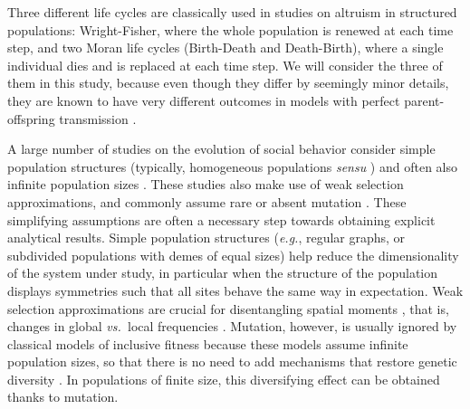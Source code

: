 \documentclass[11pt, letterpaper]{article}
\newcommand{\eg}{\textit{e.g.}}
\newcommand{\vs}{\textit{vs.\ }}
\begin{document}
Three different life cycles are classically used in studies on altruism in structured populations: Wright-Fisher, where the whole population is renewed at each time step, and two Moran life cycles (Birth-Death and Death-Birth), where a single individual dies and is replaced at each time step. We will consider the three of them in this study, because even though they differ by seemingly minor details, they are known to have very different outcomes in models with perfect parent-offspring transmission \citep[\eg,][]{Taylor1992islandmodel, Rousset2004Book,Ohtsuki2006, Lehmann2007, Taylor2010}.    

A large number of studies on the evolution of social behavior consider simple population structures (typically, homogeneous populations \textit{sensu} \citet[][]{TaylorDayWild2007}) and often also infinite population sizes \citep[but see][for results on any structure]{Allen2017}. 
These studies also make use of weak selection approximations, and commonly assume rare \citep[\eg,][]{LeturqueRousset2002, Taylor2007JTB, TarnitaTaylor2014} or absent mutation \citep[for models assuming infinite population sizes, or models concentrating on fixation probabilities; see][for recent reviews]{LehmannRousset2014,VanCleve2015}. 
These simplifying assumptions are often a necessary step towards obtaining explicit analytical results. 
Simple population structures (\eg, regular graphs, or subdivided populations with demes of equal sizes) help reduce the dimensionality of the system under study, in particular when the structure of the population displays symmetries such that all sites behave the same way in expectation. 
Weak selection approximations are crucial for disentangling spatial moments \citep{Lion2016}, that is, changes in global \vs local frequencies \citep[though they can in some cases be relaxed, as in][]{MullonLehmann2014}. 
Mutation, however, is usually ignored by classical models of inclusive fitness because these models assume infinite population sizes, so that there is no need to add mechanisms that restore genetic diversity \citep{TarnitaTaylor2014}. In populations of finite size,  this diversifying effect can be obtained thanks to mutation. %
\end{document}
